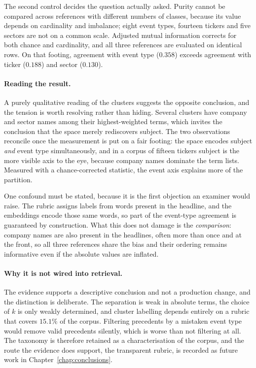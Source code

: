 The second control decides the question actually asked. Purity cannot be compared across references
with different numbers of classes, because its value depends on cardinality and imbalance; eight
event types, fourteen tickers and five sectors are not on a common scale. Adjusted mutual
information corrects for both chance and cardinality, and all three references are evaluated on
identical rows. On that footing, agreement with event type ($0.358$) exceeds agreement with ticker
($0.188$) and sector ($0.130$).

\paragraph{Reading the result.} A purely qualitative reading of the clusters suggests the opposite
conclusion, and the tension is worth resolving rather than hiding. Several clusters have company and
sector names among their highest-weighted terms, which invites the conclusion that the space merely
rediscovers subject. The two observations reconcile once the measurement is put on a fair footing:
the space encodes subject \emph{and} event type simultaneously, and in a corpus of fifteen tickers
subject is the more visible axis to the eye, because company names dominate the term lists. Measured
with a chance-corrected statistic, the event axis explains more of the partition.

One confound must be stated, because it is the first objection an examiner would raise. The rubric
assigns labels from words present in the headline, and the embeddings encode those same words, so
part of the event-type agreement is guaranteed by construction. What this does not damage is the
\emph{comparison}: company names are also present in the headlines, often more than once and at the
front, so all three references share the bias and their ordering remains informative even if the
absolute values are inflated.

\paragraph{Why it is not wired into retrieval.} The evidence supports a descriptive conclusion and
not a production change, and the distinction is deliberate. The separation is weak in absolute terms,
the choice of $k$ is only weakly determined, and cluster labelling depends entirely on a rubric that
covers $15.1\%$ of the corpus. Filtering precedents by a mistaken event type would remove valid
precedents silently, which is worse than not filtering at all. The taxonomy is therefore retained as
a characterisation of the corpus, and the route the evidence does support, the transparent rubric,
is recorded as future work in Chapter~\ref{chap:conclusions}.

